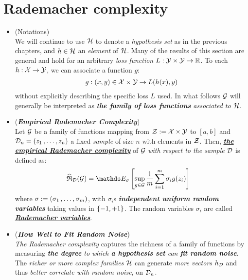 \documentclass[11pt]{article}
\begin{document}
\section{Rademacher complexity}
\begin{itemize}
\item \begin{remark} (Notations)\\
We will continue to use ${\mathcal H}$ to denote a \emph{hypothesis set} as in the previous chapters, and $h \in {\mathcal H}$ an \emph{element} of ${\mathcal H}$. Many of the results of this section are general and hold for an arbitrary \emph{loss function} $L: {\mathcal Y} \times {\mathcal Y} \to {\mathbb R}$. To each $h: {\mathcal X} \to {\mathcal Y}$, we can associate a function $g$:
\begin{align*}
g: (x, y) \in {\mathcal X} \times {\mathcal Y} \to L(h(x), y)
\end{align*} without explicitly describing the specific loss $L$ used. In what follows ${\mathcal G}$ will generally be interpreted as \emph{\textbf{the family of loss functions} associated to ${\mathcal H}$}. 
\end{remark}


\item \begin{definition} (\emph{\textbf{Empirical Rademacher Complexity}})\\
Let ${\mathcal G}$ be a family of functions mapping from ${\mathcal Z} := {\mathcal X} \times {\mathcal Y}$ to $[a, b]$ and ${\mathcal D}_{n} = (z_1 \,{,}\ldots{,}\, z_n)$ a fixed \emph{sample} of size $n$ with elements in ${\mathcal Z}$. Then, \underline{\emph{\textbf{the empirical Rademacher complexity}}} of ${\mathcal G}$ \emph{with respect to the sample ${\mathcal D}$} is defined as:
\begin{align}
\widehat{\mathfrak{R}}_{\cD}(\cG)&= \E{\sigma}{\sup_{g \in \cG}\frac{1}{m}\sum_{i=1}^{m}\sigma_{i}g(z_i)}   \label{eqn: rademacher_complexity}
\end{align}
where $\sigma := (\sigma_1 \,{,}\ldots{,}\, \sigma_m)$, with $\sigma_i$s \textbf{\emph{independent uniform random variables}} taking values in $\left\{-1, +1\right\}$. The random variables $\sigma_i$ are called \underline{\emph{\textbf{Rademacher variables}}}.
\end{definition}

\item \begin{remark} (\emph{\textbf{How Well to Fit Random Noise}})\\
\emph{The Rademacher complexity} captures the richness of a family of functions by measuring \emph{\textbf{the degree} to which \textbf{a hypothesis set} can \textbf{fit random noise}}. The \emph{richer or more complex families} ${\mathcal H}$ can generate \emph{more vectors} $h_{{\mathcal D}}$ and thus \emph{better correlate with random noise}, on ${\mathcal D}_n$.


\end{remark}
\end{itemize}
\end{document}
